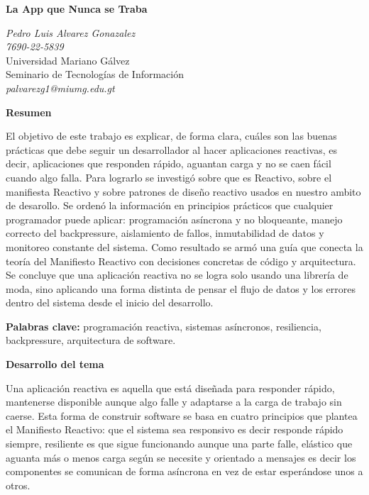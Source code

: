 \documentclass[12pt,letterpaper]{article}
\begin{document}
\begin{center}
\textbf{\Large La App que Nunca se Traba}
\end{center}

\begin{center}
\textit{Pedro Luis Alvarez Gonazalez} \\
\textit{7690-22-5839} \\
Universidad Mariano Gálvez \\
Seminario de Tecnologías de Información \\
\textit{palvarezg1@miumg.edu.gt}
\end{center}

\vspace{0.5cm}

\textbf{Resumen}

El objetivo de este trabajo es explicar, de forma clara, cuáles son las buenas prácticas que debe seguir un desarrollador al hacer aplicaciones reactivas, es decir, aplicaciones que responden rápido, aguantan carga y no se caen fácil cuando algo falla. Para lograrlo se investigó sobre que es Reactivo, sobre el manifiesta Reactivo y sobre patrones de diseño reactivo usados en nuestro ambito de desarollo. Se ordenó la información en principios prácticos que cualquier programador puede aplicar: programación asíncrona y no bloqueante, manejo correcto del backpressure, aislamiento de fallos, inmutabilidad de datos y monitoreo constante del sistema. Como resultado se armó una guía que conecta la teoría del Manifiesto Reactivo con decisiones concretas de código y arquitectura. Se concluye que una aplicación reactiva no se logra solo usando una librería de moda, sino aplicando una forma distinta de pensar el flujo de datos y los errores dentro del sistema desde el inicio del desarrollo.

\textbf{Palabras clave:} programación reactiva, sistemas asíncronos, resiliencia, backpressure, arquitectura de software.

\textbf{Desarrollo del tema}

Una aplicación reactiva es aquella que está diseñada para responder rápido, mantenerse disponible aunque algo falle y adaptarse a la carga de trabajo sin caerse. Esta forma de construir software se basa en cuatro principios que plantea el Manifiesto Reactivo: que el sistema sea responsivo es decir responde rápido siempre, resiliente es que sigue funcionando aunque una parte falle, elástico que aguanta más o menos carga según se necesite y orientado a mensajes es decir los componentes se comunican de forma asíncrona en vez de estar esperándose unos a otros.
\end{document}
